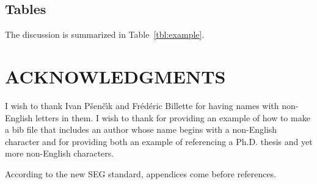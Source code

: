 \documentclass[paper,revised]{geophysics}
\begin{document}
\subsection{Tables}

The discussion is summarized in Table~\ref{tbl:example}.


\section{ACKNOWLEDGMENTS}

I wish to thank Ivan P\v{s}en\v{c}\'{\i}k and Fr\'ed\'eric Billette
for having names with non-English letters in them.  I wish to thank
\cite{Cerveny} for providing an example of how to make a bib file that
includes an author whose name begins with a non-English character and
\cite{forgues96} for providing both an example of referencing a Ph.D.
thesis and yet more non-English characters.

\label{example}

According to the new SEG standard, appendices come before references.
\end{document}
